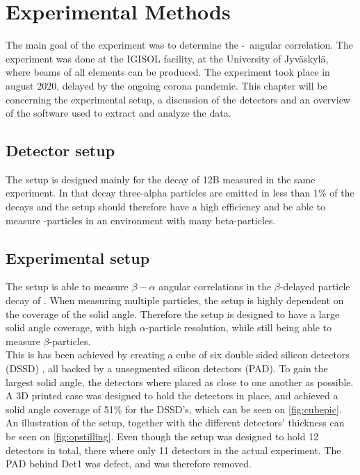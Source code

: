 \chapter{Experimental Methods}
The main goal of the experiment was to determine the \be-\al\ angular correlation. The experiment was done at the IGISOL facility, at the University of Jyväskylä, where beams of all elements can be produced. The experiment took place in august 2020, delayed by the ongoing corona pandemic. This chapter will be concerning the experimental setup, a discussion of the detectors and an overview of the software used to extract and analyze the data. 

\section{Detector setup}

The setup is designed mainly for the decay of 12B measured in the same experiment. In that decay three-alpha particles are emitted in less than 1\% of the decays and the setup should therefore have a high efficiency and be able to measure \al-particles in an environment with many beta-particles. 
\section{Experimental setup}
The setup is able to measure $\beta-\alpha$ angular correlations in the $\beta$-delayed particle decay of . When measuring multiple particles, the setup is highly dependent on the coverage of the solid angle. Therefore the setup is designed to have a large solid angle coverage, with high $\alpha$-particle resolution, while still being able to measure $\beta$-particles.\\
This is has been achieved by creating a cube of six double sided silicon detectors (DSSD) , all backed by a unsegmented silicon detectors (PAD). To gain the largest solid angle, the detectors where placed as close to one another as possible. A 3D printed case was designed to hold the detectors in place, and achieved a solid angle coverage of 51\% for the DSSD's, which can be seen on \cref{fig:cubepic}. An illustration of the setup, together with the different detectors' thickness can be seen on \cref{fig:opstilling}. 
Even though the setup was designed to hold 12 detectors in total, there where only 11 detectors in the actual experiment. The PAD behind Det1 was defect, and was therefore removed. 


